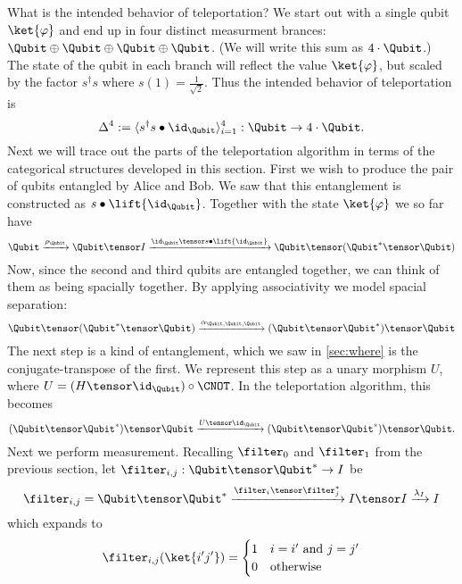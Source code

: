 What is the intended behavior of teleportation? We start out with a single qubit $\ket{\varphi}$
and end up in four distinct measurment brances: $\Qubit \oplus \Qubit \oplus \Qubit \oplus \Qubit$.
(We will write this sum as $4 \cdot \Qubit$.) The state of the qubit in each branch will reflect
the value $\ket{\varphi}$, but scaled by the factor $s^\dagger s$ where $s(1) = \frac 1 {\sqrt{2}}$.
Thus the intended behavior of teleportation is
\[ \Delta^4 := \langle s^\dagger s \bullet \id_\Qubit \rangle_{i=1}^{4} : \Qubit \rightarrow 4 \cdot \Qubit. \]
Next we will trace out the parts of the teleportation algorithm in terms of the categorical 
structures developed in this section.
First we wish to produce the pair of qubits entangled by Alice and Bob. We saw that this entanglement
is constructed as $s \bullet \lift{\id_{\Qubit}}$. Together with the state 
$\ket{\varphi}$ we so far have
\[
    \Qubit \xrightarrow{\rho_\Qubit} \Qubit \tensor I 
    \xrightarrow {\id_\Qubit \tensor s \bullet \lift{\id_\Qubit}} 
    \Qubit \tensor (\Qubit^* \tensor \Qubit)
\]
Now, since the second and third qubits are entangled together, we can think of them as being
spacially together. By applying associativity we model spacial separation:
\[
    \Qubit \tensor (\Qubit^* \tensor \Qubit) 
    \xrightarrow{\alpha_{\Qubit,\Qubit,\Qubit}}
    (\Qubit \tensor \Qubit^*) \tensor \Qubit
\]
The next step is a kind of entanglement, which we saw in \cref{sec:where} is the 
conjugate-transpose of the first. We represent this step as a unary morphism $U$, where 
$U = (H \tensor \id_\Qubit) \circ \CNOT$. In the teleportation algorithm, this becomes
\[
    (\Qubit \tensor \Qubit^*) \tensor \Qubit
    \xrightarrow{U \tensor \id_\Qubit}
    (\Qubit \tensor \Qubit^*) \tensor \Qubit.
\]
Next we perform measurement. Recalling $\filter_0$ and $\filter_1$ from the previous
section, let $\filter_{i,j} : \Qubit \tensor \Qubit^* \rightarrow I$ be
\[ \filter_{i,j} = \Qubit \tensor \Qubit^*
    \xrightarrow{\filter_i \tensor \filter_j^*}
    I \tensor I
    \xrightarrow{\lambda_I}
    I
\]
which expands to
\[
    \filter_{i,j}(\ket{i'j'}) = \begin{cases}
        1 & i=i' \text{ and } j=j' \\
        0 & \text{otherwise}
    \end{cases}
\]

